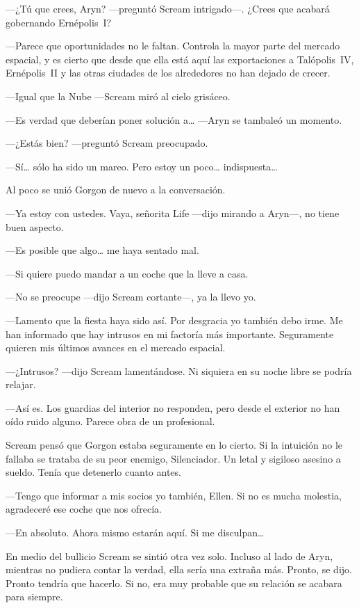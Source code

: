 ---¿Tú que crees, Aryn? ---preguntó Scream intrigado---. ¿Crees que acabará gobernando Ernépolis~I?

---Parece que oportunidades no le faltan. Controla la mayor parte del mercado espacial, y es cierto que desde que ella está aquí las exportaciones a Talópolis~IV, Ernépolis~II y las otras ciudades de los alrededores no han dejado de crecer.

---Igual que la Nube ---Scream miró al cielo grisáceo.

---Es verdad que deberían poner solución a\dots{} ---Aryn se tambaleó un momento.

---¿Estás bien? ---preguntó Scream preocupado.

---Sí\dots{} sólo ha sido un mareo. Pero estoy un poco\dots{} indispuesta\dots

Al poco se unió Gorgon de nuevo a la conversación.

---Ya estoy con ustedes. Vaya, señorita Life ---dijo mirando a Aryn---, no tiene buen aspecto.

---Es posible que algo\dots{} me haya sentado mal.

---Si quiere puedo mandar a un coche que la lleve a casa.

---No se preocupe ---dijo Scream cortante---, ya la llevo yo.

---Lamento que la fiesta haya sido así. Por desgracia yo también debo irme. Me han informado que hay intrusos en mi factoría más importante. Seguramente quieren mis últimos avances en el mercado espacial.

---¿Intrusos? ---dijo Scream lamentándose. Ni siquiera en su noche libre se podría relajar.

---Así es. Los guardias del interior no responden, pero desde el exterior no han oído ruido alguno. Parece obra de un profesional.

Scream pensó que Gorgon estaba seguramente en lo cierto. Si la intuición no le fallaba se trataba de su peor enemigo, Silenciador. Un letal y sigiloso asesino a sueldo. Tenía que detenerlo cuanto antes.

---Tengo que informar a mis socios yo también, Ellen. Si no es mucha molestia, agradeceré ese coche que nos ofrecía.

---En absoluto. Ahora mismo estarán aquí. Si me disculpan\dots

En medio del bullicio Scream se sintió otra vez solo. Incluso al lado de Aryn, mientras no pudiera contar la verdad, ella sería una extraña más. Pronto, se dijo. Pronto tendría que hacerlo. Si no, era muy probable que su relación se acabara para siempre.

